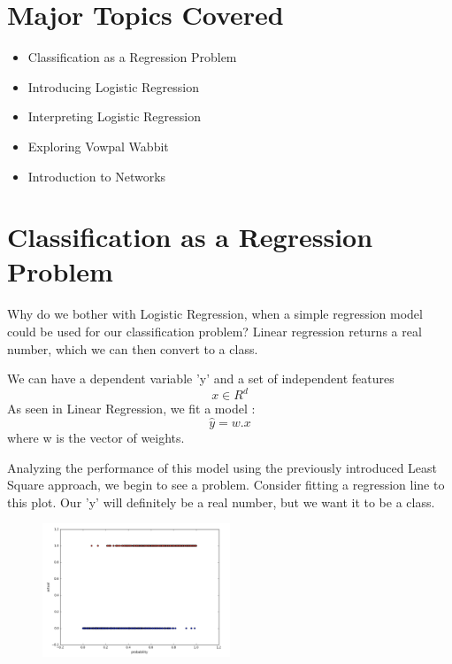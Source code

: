 
\section{Major Topics Covered}
\begin{itemize}
  \item Classification as a Regression Problem
  \item Introducing Logistic Regression
  \item Interpreting Logistic Regression
  \item Exploring Vowpal Wabbit
  \item Introduction to Networks
\end{itemize}


\section{Classification as a Regression Problem}

Why do we bother with Logistic Regression, when a simple regression model could be used for our classification problem? Linear regression returns a real number, which we can then convert to a class.

We can have a dependent variable 'y' and a set of independent features 
\begin{equation}
  x \in R ^{d}
\end{equation}
As seen in Linear Regression, we fit a model :
\begin{equation}
  \hat{y} = w.x
\end{equation}
where w is the vector of weights.

Analyzing the performance of this model using the previously introduced Least Square approach, we begin to see a problem. Consider fitting a regression line to this plot. Our 'y' will definitely be a real number, but we want it to be a class.

\begin{figure}[ht]
  \begin{center}
    \includegraphics[width=0.5\textwidth]{figures/fig-1.png}
    \caption{}
    \label{fig:example_figure}
  \end{center}
\end{figure}

